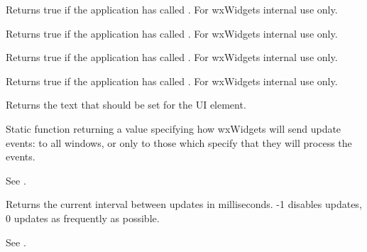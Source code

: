 
Returns true if the application has called . For wxWidgets internal use only.

\label{wxupdateuieventgetsetenabled}


Returns true if the application has called . For wxWidgets internal use only.

\label{wxupdateuieventgetsetshown}


Returns true if the application has called . For wxWidgets internal use only.

\label{wxupdateuieventgetsettext}


Returns true if the application has called . For wxWidgets internal use only.

\label{wxupdateuieventgettext}


Returns the text that should be set for the UI element.

\label{wxupdateuieventgetmode}


Static function returning a value specifying how wxWidgets
will send update events: to all windows, or only to those which specify that they
will process the events.

See .

\label{wxupdateuieventgetupdateinterval}


Returns the current interval between updates in milliseconds.
-1 disables updates, 0 updates as frequently as possible.

See .

